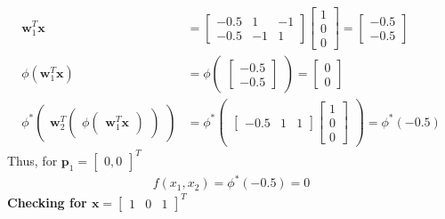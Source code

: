 \begin{align*}
  \textbf{w}_1^T\textbf{x} &= \begin{bmatrix}
    -0.5 & 1 & -1 \\
    -0.5 & -1 & 1 
  \end{bmatrix} \begin{bmatrix}
    1\\
    0 \\
    0
  \end{bmatrix} = \begin{bmatrix}
    -0.5 \\
    -0.5
  \end{bmatrix} \\
  \phi(\textbf{w}_1^T\textbf{x}) &= \phi\begin{pmatrix}
    \begin{bmatrix}
      -0.5 \\
      -0.5
    \end{bmatrix}
  \end{pmatrix} = \begin{bmatrix}
    0 \\
    0
  \end{bmatrix} \\
  \phi^{*} \begin{pmatrix}
    \textbf{w}_2^T 
    \begin{pmatrix}
      \phi \begin{pmatrix}
        \textbf{w}_1^T\textbf{x}
    \end{pmatrix}  
  \end{pmatrix}
  \end{pmatrix} &= \phi^{*}\begin{pmatrix}
    \begin{bmatrix}
      -0.5 & 1 & 1
    \end{bmatrix} \begin{bmatrix}
      1 \\ 
      0 \\
      0
    \end{bmatrix}
  \end{pmatrix} = \phi^{*}(-0.5)
\end{align*}
Thus, for $\textbf{p}_1 = \begin{bmatrix}
  0,0
\end{bmatrix}^T$
\begin{align*}
  f(x_1,x_2) = \phi^{*} (-0.5) = 0
\end{align*}
\textbf{Checking for $\textbf{x} = \begin{bmatrix} 1 & 0 & 1 \end{bmatrix}^T$}
